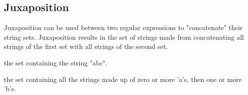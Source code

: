 
\subsection{Juxaposition}
{
	Juxaposition can be used between two regular expressions to "concatenate"
	their string sets.
	Juxaposition results in the set of strings made from concatenating all
	strings of the first set with all strings of the second set.
	
	\begin{itemize}
	{
		\item[\texttt{"a" "b" "c"}] the set containing the string "abc".
		
		\item[\texttt{"a"* "b"+}] the set containing all the strings made up
			of zero or more 'a's, then one or more 'b's.
	}
	\end{itemize}
}
